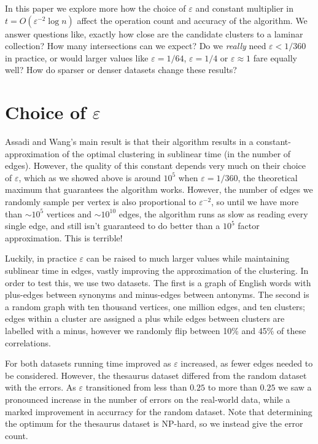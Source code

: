 \documentclass[
]{article}
\begin{document}
In this paper we explore more how the choice of {\(\varepsilon\)} and
constant multiplier in {\(t = O(\varepsilon^{- 2}\log n)\)} affect the
operation count and accuracy of the algorithm. We answer questions like,
exactly how close are the candidate clusters to a laminar collection?
How many intersections can we expect? Do we \emph{really} need
  {\(\varepsilon < 1/360\)} in practice, or would larger values like
  {\(\varepsilon = 1/64\)}, {\(\varepsilon = 1/4\)} or
  {\(\varepsilon \approx 1\)} fare equally well? How do sparser or denser
datasets change these results?

\hypertarget{choice-of-varepsilon}{%
  \section{\texorpdfstring{Choice of
        {\(\varepsilon\)}}{Choice of \textbackslash varepsilon}}\label{choice-of-varepsilon}}

Assadi and Wang's main result is that their algorithm
results in a constant-approximation of the optimal clustering in
sublinear time (in the number of edges). However, the quality of this constant depends very much
on their choice of {\(\varepsilon\)}, which as we showed above is around $10^5$ when $\varepsilon = 1/360$, the theoretical maximum that guarantees the algorithm works. However, the number of edges we randomly sample per vertex is also proportional to $\varepsilon^{-2}$, so until we have more than $\sim 10^{5}$ vertices and $\sim 10^{10}$ edges, the algorithm runs as slow as reading every single edge, and still isn't guaranteed to do better than a $10^5$ factor approximation. This is terrible!

Luckily, in practice {\(\varepsilon\)} can be raised to much larger
values while maintaining sublinear time in edges, vastly improving the
approximation of the clustering. In order to test this, we use two
datasets. The first is a graph of English words with plus-edges between
synonyms and minus-edges between antonyms. The second is a random graph
with ten thousand vertices, one million edges, and ten clusters; edges
within a cluster are assigned a plus while edges between clusters are
labelled with a minus, however we randomly flip between 10\% and 45\% of
these correlations.

For both datasets running time improved as {\(\varepsilon\)} increased,
as fewer edges needed to be considered. However, the thesaurus dataset
differed from the random dataset with the errors. As {\(\varepsilon\)}
transitioned from less than {\(0.25\)} to more than {\(0.25\)} we saw a
pronounced increase in the number of errors on the real-world data,
while a marked improvement in accurracy for the random dataset. Note
that determining the optimum for the thesaurus dataset is NP-hard, so we
instead give the error count.
\end{document}

